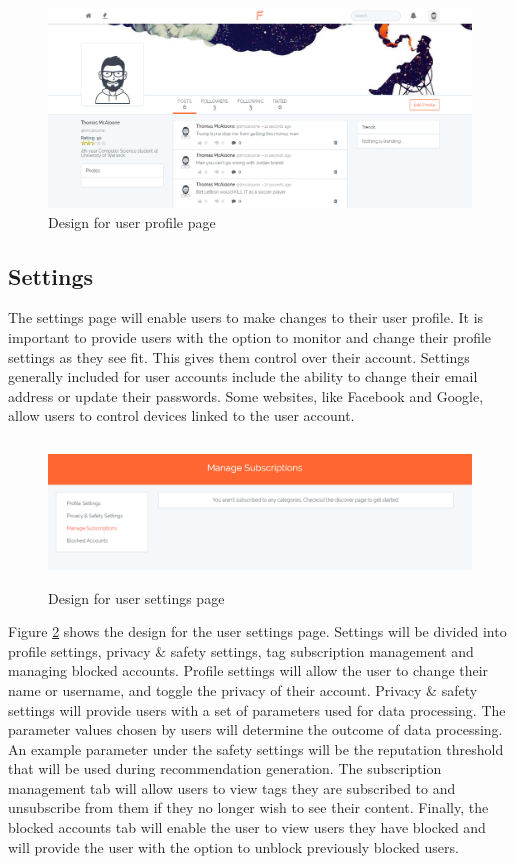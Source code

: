 \begin{figure}[H]
\centering
\includegraphics[width=\linewidth]{Images/Design/user_profile}
\caption{Design for user profile page}
\label{fig:user_profile}
\end{figure}

\subsection{Settings}
The settings page will enable users to make changes to their user profile. It is important to provide users with the option to monitor and change their profile settings as they see fit. This gives them control over their account. Settings generally included for user accounts include the ability to change their email address or update their passwords. Some websites, like Facebook and Google, allow users to control devices linked to the user account.

\begin{figure}[H]
\centering
\includegraphics[height=1.5in]{Images/Design/SettingsPage}
\caption{Design for user settings page}
\label{fig:SettingsPage}
\end{figure}

Figure \ref{fig:SettingsPage} shows the design for the user settings page. Settings will be divided into profile settings, privacy \& safety settings, tag subscription management and managing blocked accounts. Profile settings will allow the user to change their name or username, and toggle the privacy of their account. Privacy \& safety settings will provide users with a set of parameters used for data processing. The parameter values chosen by users will determine the outcome of data processing. An example parameter under the safety settings will be the reputation threshold that will be used during recommendation generation. The subscription management tab will allow users to view tags they are subscribed to and unsubscribe from them if they no longer wish to see their content. Finally, the blocked accounts tab will enable the user to view users they have blocked and will provide the user with the option to unblock previously blocked users.

